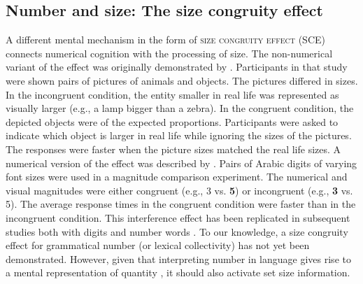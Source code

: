 \documentclass[output=paper]{langscibook}
\begin{document}
\subsection{Number and size: The size congruity effect}
A different mental mechanism in the form of \textsc{size congruity effect} (SCE) connects numerical cognition with the processing of size. The non-numerical variant of the effect was originally demonstrated by \citet{paivioPerceptualComparisonsMind1975}. Participants in that study were shown pairs of pictures of animals and objects. The pictures differed in sizes. In the incongruent condition, the entity smaller in real life was represented as visually larger (e.g., a lamp bigger than a zebra). In the congruent condition, the depicted objects were of the expected proportions. Participants were asked to indicate which object is larger in real life while ignoring the sizes of the pictures. The responses were faster when the picture sizes matched the real life sizes. A numerical version of the effect was described by \citet{henikThreeGreaterFive1982}. Pairs of Arabic digits of varying font sizes were used in a magnitude comparison experiment. The numerical and visual magnitudes were either congruent (e.g., {\small 3} vs. {\Large \textbf{5}}) or incongruent (e.g., {\Large \textbf{3}} vs. {\small 5}). The average response times in the congruent condition were faster than in the incongruent condition. This interference effect has been replicated in subsequent studies both with digits and number words \citep{besnerIdeographicAlphabeticProcessing1979,cohenkadoshEffectOrientationNumber2007,foltzMentalComparisonSize1984}.\footnotemark{} To our knowledge, a size congruity effect for grammatical number (or lexical collectivity) has not yet been demonstrated. However, given that interpreting number in language gives rise to a mental representation of quantity \citep{patsonSingularInterpretationsLinger2016,patsonConceptualRepresentationNumber2014}, it should also activate set size information.
\end{document}
